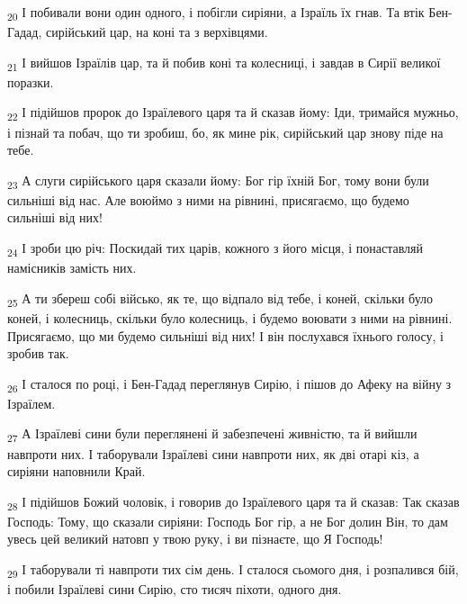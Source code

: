 \begin{tcolorbox}
\textsubscript{20} І побивали вони один одного, і побігли сиріяни, а Ізраїль їх гнав. Та втік Бен-Гадад, сирійський цар, на коні та з верхівцями.
\end{tcolorbox}
\begin{tcolorbox}
\textsubscript{21} І вийшов Ізраїлів цар, та й побив коні та колесниці, і завдав в Сирії великої поразки.
\end{tcolorbox}
\begin{tcolorbox}
\textsubscript{22} І підійшов пророк до Ізраїлевого царя та й сказав йому: Іди, тримайся мужньо, і пізнай та побач, що ти зробиш, бо, як мине рік, сирійський цар знову піде на тебе.
\end{tcolorbox}
\begin{tcolorbox}
\textsubscript{23} А слуги сирійського царя сказали йому: Бог гір їхній Бог, тому вони були сильніші від нас. Але воюймо з ними на рівнині, присягаємо, що будемо сильніші від них!
\end{tcolorbox}
\begin{tcolorbox}
\textsubscript{24} І зроби цю річ: Поскидай тих царів, кожного з його місця, і понаставляй намісників замість них.
\end{tcolorbox}
\begin{tcolorbox}
\textsubscript{25} А ти збереш собі військо, як те, що відпало від тебе, і коней, скільки було коней, і колесниць, скільки було колесниць, і будемо воювати з ними на рівнині. Присягаємо, що ми будемо сильніші від них! І він послухався їхнього голосу, і зробив так.
\end{tcolorbox}
\begin{tcolorbox}
\textsubscript{26} І сталося по році, і Бен-Гадад переглянув Сирію, і пішов до Афеку на війну з Ізраїлем.
\end{tcolorbox}
\begin{tcolorbox}
\textsubscript{27} А Ізраїлеві сини були переглянені й забезпечені живністю, та й вийшли навпроти них. І таборували Ізраїлеві сини навпроти них, як дві отарі кіз, а сиріяни наповнили Край.
\end{tcolorbox}
\begin{tcolorbox}
\textsubscript{28} І підійшов Божий чоловік, і говорив до Ізраїлевого царя та й сказав: Так сказав Господь: Тому, що сказали сиріяни: Господь Бог гір, а не Бог долин Він, то дам увесь цей великий натовп у твою руку, і ви пізнаєте, що Я Господь!
\end{tcolorbox}
\begin{tcolorbox}
\textsubscript{29} І таборували ті навпроти тих сім день. І сталося сьомого дня, і розпалився бій, і побили Ізраїлеві сини Сирію, сто тисяч піхоти, одного дня.
\end{tcolorbox}
